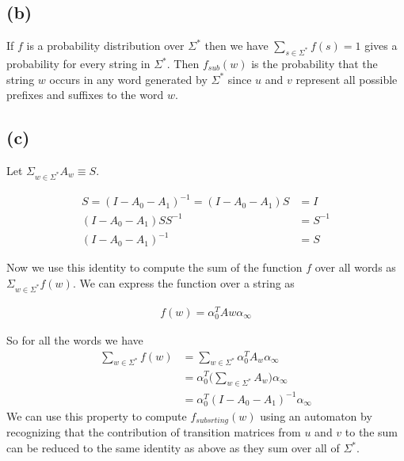 \documentclass[11pt]{amsart}
\begin{document}
\subsection{(b)}

If $f$ is a probability distribution over $\Sigma^*$ then we have $\sum_{s \in \Sigma^*} f(s) = 1$ gives a probability for every string in $\Sigma^*$. Then $f_{sub}(w)$ is the probability that the string $w$ occurs in any word generated by $\Sigma^*$ since $u$ and $v$ represent all possible prefixes and suffixes to the word $w$.

\subsection{(c)}

Let $ \Sigma_{w \in \Sigma^*} A_w \equiv S$.

\begin{equation}
\begin{aligned}
S = (I - A_0 - A_1)^{-1} = (I - A_0 - A_1) S          &= I \\
				       (I - A_0 - A_1)SS^{-1} &= S^{-1}	\\
				       (I - A_0 - A_1)^{-1} 	&= S
\end{aligned}
\end{equation}

Now we use this identity to compute the sum of the function $f$ over all words as $ \Sigma_{w \in \Sigma^*} f(w)$. We can express the function over a string as

\begin{equation}
\begin{aligned}
f(w) = \alpha_0^T Aw \alpha_{\infty}
\end{aligned}
\end{equation}

So for all the words we have
\begin{equation}
\begin{aligned}
\sum_{w \in \Sigma^*} f(w) &= \sum_{w \in \Sigma^*} \alpha_0^T A_w \alpha_{\infty} \\
					 &= \alpha_0^T \bigg( \sum_{w \in \Sigma^*}  A_w  \bigg) \alpha_{\infty} \\
					 &= \alpha_0^T (I - A_0 - A_1)^{-1} \alpha_{\infty}
\end{aligned}
\end{equation}
We can use this property to compute $f_{subsrting}(w)$ using an automaton by recognizing that the contribution of transition matrices from $u$ and $v$ to the sum can be reduced to the same identity as above as they sum over all of $\Sigma^*$.
\end{document}
